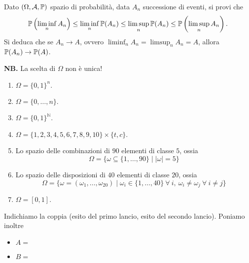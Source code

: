 \Esercizio{$\star$}

Dato $( \Omega ,\mathcal{A} ,\mathbb{P})$ spazio di probabilità, data $A_{n}$ successione di eventi, si provi che
\begin{equation*}
	\mathbb{P}\left(\liminf _{n} A_{n}\right) \leq \liminf _{n}\mathbb{P}( A_{n}) \leq \limsup _{n}\mathbb{P}( A_{n})\leq \mathbb{P}\left(\limsup _{n} A_{n}\right) .
\end{equation*}
Si deduca che se $A_{n}\rightarrow A$, ovvero $\liminf_{n} A_{n} =\limsup _{n} A_{n} =A$, allora $\mathbb{P}( A_{n})\rightarrow \mathbb{P}( A)$.

\ParteSoluzioni

\Soluzione


\textbf{NB.} La scelta di $\Omega $ non è unica!
\begin{enumerate}
	\item $\Omega =\{0,1\}^{n} .$
	\item $\Omega =\{0,\dots ,n\}$.
	\item $\Omega =\{0,1\}^{\mathbb{N}}$.
	\item $\Omega =\{1,2,3,4,5,6,7,8,9,10\} \times \{t,c\}$.
	\item Lo spazio delle combinazioni di $90$ elementi di classe $5$, ossia
	\begin{equation*}
		\Omega =\{\omega \subseteq \{1,\dots ,90\} \mid |\omega |=5\}
	\end{equation*}
	\item Lo spazio delle disposizioni di $40$ elementi di classe $20$, ossia
	\begin{equation*}
		\Omega =\{\omega =( \omega _{1} ,\dots ,\omega _{20}) \mid \omega _{i} \in \{1,\dots ,40\} \ \forall \ i,\ \omega _{i} \neq \omega _{j} \ \forall \ i\neq j\}
	\end{equation*}
	\item $\Omega =[ 0,1]$.
\end{enumerate}

\Soluzione

Indichiamo la coppia (esito del primo lancio, esito del secondo lancio). Poniamo inoltre
\begin{itemize}
	\item $A=$ 
	\item $B=$ 
\end{itemize}

